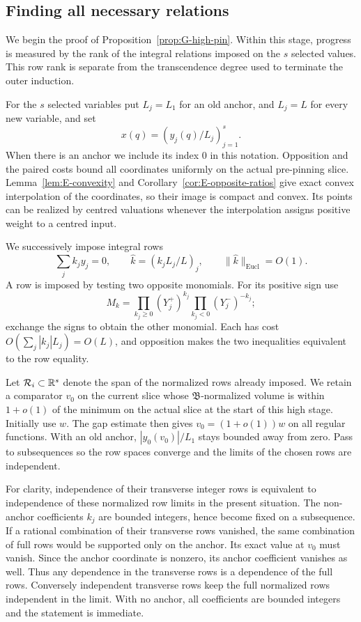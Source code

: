 \subsection{Finding all necessary relations}\label{subsec:G-pin-rows}

We begin the proof of Proposition~\ref{prop:G-high-pin}.  Within this
stage, progress is measured by the rank of the integral relations imposed
on the $s$ selected values.  This row rank is separate from the
transcendence degree used to terminate the outer induction.

For the $s$ selected variables put $L_j=L_1$ for an old anchor, and
$L_j=L$ for every new variable, and set
\[
                     x(q)=(y_j(q)/L_j)_{j=1}^s.
\]
When there is an anchor we include its index $0$ in this notation.
Opposition and the paired costs bound all coordinates uniformly on the
actual pre-pinning slice.  Lemma~\ref{lem:E-convexity} and Corollary~\ref{cor:E-opposite-ratios}
give exact convex interpolation of the coordinates, so their image is compact and
convex.  Its points can be realized by centred valuations whenever the
interpolation assigns positive weight to a centred input.

We successively impose integral rows
\begin{equation}\label{eq:G-row}
 \sum_j k_jy_j=0,
 \qquad \widehat k=(k_jL_j/L)_j,
 \qquad \|\widehat k\|_{\mathrm{Eucl}}=O(1).
\end{equation}
A row is imposed by testing two opposite monomials.  For its positive
sign use
\[
 M_k=\prod_{k_j\ge0}(Y_j^+)^{k_j}
       \prod_{k_j<0}(Y_j^-)^{-k_j};
\]
exchange the signs to obtain the other monomial.
Each has cost $O(\sum_j|k_j|L_j)=O(L)$, and opposition makes the two
inequalities equivalent to the row equality.

Let $\mathcal R_i\subset\mathbb R^s$ denote the span of the normalized rows
already imposed.  We retain a comparator $v_0$ on the current slice
whose $\mathfrak B$-normalized volume is within $1+o(1)$ of the minimum
on the actual slice at the start of this high stage.  Initially use $w$.
The gap estimate then gives $v_0=(1+o(1))w$ on all regular functions.
With an old anchor, $|y_0(v_0)|/L_1$ stays bounded away from zero.
Pass to subsequences so the row spaces converge and the limits of the
chosen rows are independent.

For clarity, independence of their transverse integer rows is equivalent
to independence of these normalized row limits in the present situation.
The non-anchor coefficients $k_j$ are bounded integers, hence become
fixed on a subsequence.  If a rational combination of their transverse
rows vanished, the same combination of full rows would be supported
only on the anchor.  Its exact value at $v_0$ must vanish.  Since the
anchor coordinate is nonzero, its anchor coefficient vanishes as well.
Thus any dependence in the transverse rows is a dependence of the full
rows.  Conversely independent transverse rows keep the full normalized
rows independent in the limit.  With no anchor, all coefficients are
bounded integers and the statement is immediate.

